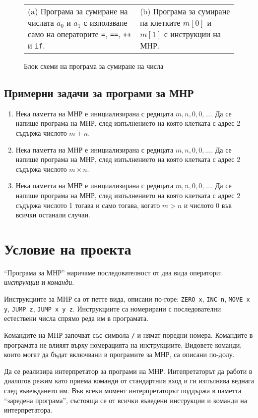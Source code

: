 \documentclass[12pt,a4paper]{article}
\newcommand{\code}[1]{\texttt{#1}}
\begin{document}
{\begin{figure}
\begin{tabular}{p{7cm} p{7cm}}
      \\
      (a) Програма за сумиране на числата $a_0$ и $a_1$ с използване само на операторите \code{=}, \code{==}, \code{++} и \code{if}.
      &
      (b) Програма за сумиране на клетките $m[0]$ и $m[1]$ с инструкции на МНР.
  \end{tabular}

  \caption{Блок схеми на програма за сумиране на числа}
  \label{fig:mnr}
\end{figure}

\subsection{Примерни задачи за програми за МНР}


\begin{enumerate}[resume]
	\item Нека паметта на МНР е инициализирана с редицата $m,n,0,0,...$. Да се напише програма на МНР, след изпълнението на която клетката с адрес 2 съдържа числото $m+n$.
	\item Нека паметта на МНР е инициализирана с редицата $m,n,0,0,...$. Да се напише програма на МНР, след изпълнението на която клетката с адрес 2 съдържа числото $m \times n$.
	\item Нека паметта на МНР е инициализирана с редицата $m,n,0,0,...$. Да се напише програма на МНР, след изпълнението на която клетката с адрес 2 съдържа числото 1 тогава и само тогава, когато $m>n$ и числото 0 във всички останали случаи.
\end{enumerate}

\section{Условие на проекта}

``Програма за МНР'' наричаме последователност от два вида оператори: \emph{инструкции} и \emph{команди}.

Инструкциите за МНР са от петте вида, описани по-горе: \code{ZERO x}, \code{INC n}, \code{MOVE x y}, \code{JUMP z}, \code{JUMP x y z}. Инструкциите са номерирани с последователни естествени числа спрямо реда им в програмата.

Командите на МНР започват със символа \code{/} и нямат поредни номера. Командите в програмата не влияят върху номерацията на инструкциите. Видовете команди, които могат да бъдат включвани в програмите за МНР, са описани по-долу. 

Да се реализира интерпретатор за програми на МНР. Интепретаторът да работи в диалогов режим като приема команди от стандартния вход и ги изпълнява веднага след въвеждането им. Във всеки момент интерпретаторът поддържа в паметта ``заредена програма'', състояща се от всички въведени инструкции и команди на интерпретатора.

}
\end{document}
